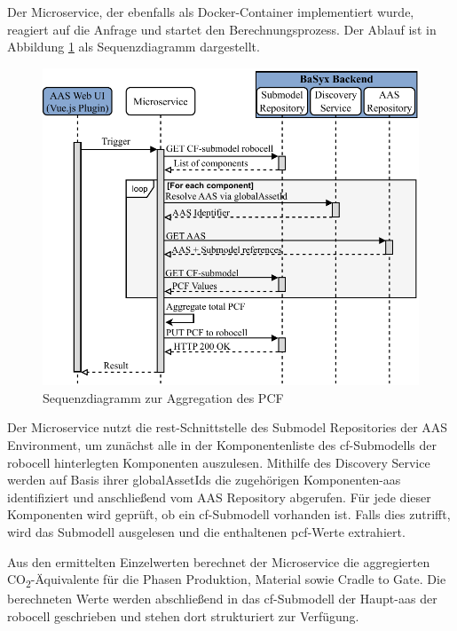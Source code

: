 Der Microservice, der ebenfalls als Docker-Container implementiert wurde, reagiert auf die Anfrage und startet den Berechnungsprozess. 
Der Ablauf ist in Abbildung \ref{fig:SequenzdiagrammPCF} als Sequenzdiagramm dargestellt.

\begin{figure}[htbp]
    \centering
        \includegraphics[width=1\textwidth]{Bilder/Ergebnisse/DPP/AggregationNue.pdf}
    \caption{Sequenzdiagramm zur Aggregation des PCF}
    \label{fig:SequenzdiagrammPCF}
\end{figure}


Der Microservice nutzt die \acs{rest}-Schnittstelle des Submodel Repositories der AAS Environment, um zunächst alle in der Komponentenliste des \acs{cf}-Submodells der robocell hinterlegten Komponenten auszulesen. 
Mithilfe des Discovery Service werden auf Basis ihrer globalAssetIds die zugehörigen Komponenten-\acs{aas} identifiziert und anschließend vom AAS Repository abgerufen.
Für jede dieser Komponenten wird geprüft, ob ein \acs{cf}-Submodell vorhanden ist. 
Falls dies zutrifft, wird das Submodell ausgelesen und die enthaltenen \acs{pcf}-Werte extrahiert.

Aus den ermittelten Einzelwerten berechnet der Microservice die aggregierten CO\textsubscript{2}-Äquivalente für die Phasen Produktion, Material sowie Cradle to Gate. 
Die berechneten Werte werden abschließend in das \acs{cf}-Submodell der Haupt-\acs{aas} der robocell geschrieben und stehen dort strukturiert zur Verfügung.

